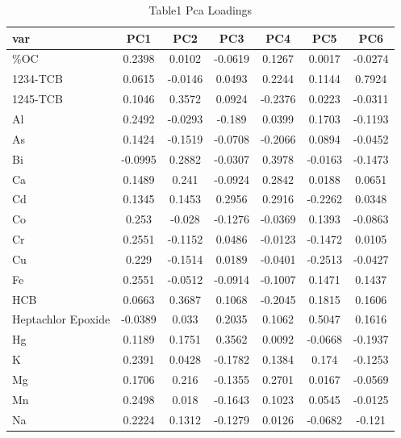 
\begin{table}[htbp]
    \centering
    \small
    \caption{Table1 Pca Loadings}
    \label{tab:table1_pca_loadings}
    \begin{tabular}{lcccccc}
        \toprule
        var & PC1 & PC2 & PC3 & PC4 & PC5 & PC6 \\
        \midrule
        \%OC & 0.2398 & 0.0102 & -0.0619 & 0.1267 & 0.0017 & -0.0274 \\
        1234-TCB & 0.0615 & -0.0146 & 0.0493 & 0.2244 & 0.1144 & 0.7924 \\
        1245-TCB & 0.1046 & 0.3572 & 0.0924 & -0.2376 & 0.0223 & -0.0311 \\
        Al & 0.2492 & -0.0293 & -0.189 & 0.0399 & 0.1703 & -0.1193 \\
        As & 0.1424 & -0.1519 & -0.0708 & -0.2066 & 0.0894 & -0.0452 \\
        Bi & -0.0995 & 0.2882 & -0.0307 & 0.3978 & -0.0163 & -0.1473 \\
        Ca & 0.1489 & 0.241 & -0.0924 & 0.2842 & 0.0188 & 0.0651 \\
        Cd & 0.1345 & 0.1453 & 0.2956 & 0.2916 & -0.2262 & 0.0348 \\
        Co & 0.253 & -0.028 & -0.1276 & -0.0369 & 0.1393 & -0.0863 \\
        Cr & 0.2551 & -0.1152 & 0.0486 & -0.0123 & -0.1472 & 0.0105 \\
        Cu & 0.229 & -0.1514 & 0.0189 & -0.0401 & -0.2513 & -0.0427 \\
        Fe & 0.2551 & -0.0512 & -0.0914 & -0.1007 & 0.1471 & 0.1437 \\
        HCB & 0.0663 & 0.3687 & 0.1068 & -0.2045 & 0.1815 & 0.1606 \\
        Heptachlor Epoxide & -0.0389 & 0.033 & 0.2035 & 0.1062 & 0.5047 & 0.1616 \\
        Hg & 0.1189 & 0.1751 & 0.3562 & 0.0092 & -0.0668 & -0.1937 \\
        K & 0.2391 & 0.0428 & -0.1782 & 0.1384 & 0.174 & -0.1253 \\
        Mg & 0.1706 & 0.216 & -0.1355 & 0.2701 & 0.0167 & -0.0569 \\
        Mn & 0.2498 & 0.018 & -0.1643 & 0.1023 & 0.0545 & -0.0125 \\
        Na & 0.2224 & 0.1312 & -0.1279 & 0.0126 & -0.0682 & -0.121 \\

\end{tabular}
\end{table}
